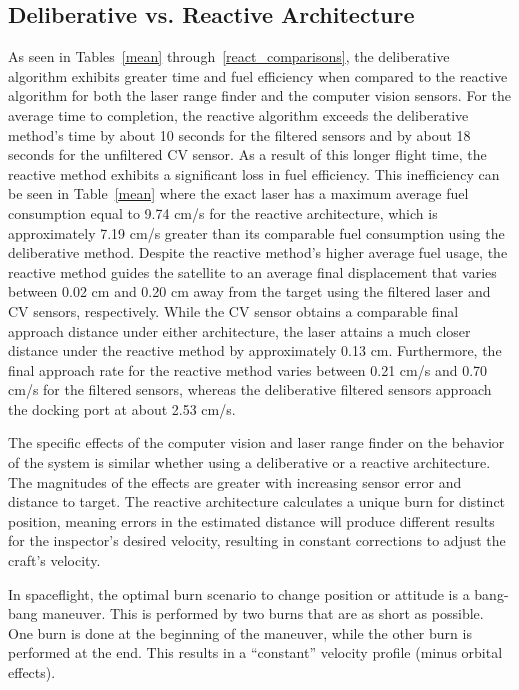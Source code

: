\documentclass[journal, 10pt]{IEEEtran}
\begin{document}
\subsection{Deliberative vs. Reactive Architecture}
As seen in Tables~\ref{mean} through~\ref{react_comparisons}, the deliberative algorithm exhibits greater time and fuel efficiency when compared to the reactive algorithm for both the laser range finder and the computer vision sensors. For the average time to completion, the reactive algorithm exceeds the deliberative method's time by about 10 seconds for the filtered sensors and by about 18 seconds for the unfiltered CV sensor. As a result of this longer flight time, the reactive method exhibits a significant loss in fuel efficiency. This inefficiency can be seen in Table~\ref{mean} where the exact laser has a maximum average fuel consumption equal to 9.74 cm/s for the reactive architecture, which is approximately 7.19 cm/s greater than its comparable fuel consumption using the deliberative method. Despite the reactive method's higher average fuel usage, the reactive method guides the satellite to an average final displacement that varies between 0.02 cm and 0.20 cm away from the target using the filtered laser and CV sensors, respectively. While the CV sensor obtains a comparable final approach distance under either architecture, the laser attains a much closer distance under the reactive method by approximately 0.13 cm. Furthermore, the final approach rate for the reactive method varies between 0.21 cm/s and 0.70 cm/s for the filtered sensors, whereas the deliberative filtered sensors approach the docking port at about 2.53 cm/s.

The specific effects of the computer vision and laser range finder on the behavior of the system is similar whether using a deliberative or a reactive architecture.  The magnitudes of the effects are greater with increasing sensor error and distance to target.  The reactive architecture calculates a unique burn for distinct position, meaning errors in the estimated distance will produce different results for the inspector's desired velocity, resulting in constant corrections to adjust the craft's velocity.

In spaceflight, the optimal burn scenario to change position or attitude is a bang-bang maneuver.  This is performed by two burns that are as short as possible.  One burn is done at the beginning of the maneuver, while the other burn is performed at the end.  This results in a ``constant'' velocity profile (minus orbital effects).  
\end{document}

